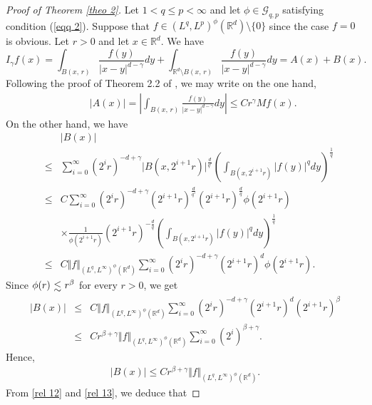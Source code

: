 \documentclass[10pt,a4paper]{amsart}
\numberwithin{equation}{section}
\numberwithin{equation}{section}
\def\lsim{\raisebox{-1ex}{$~\stackrel{\textstyle <}{\sim}~$}}
\begin{document}
\begin{proof}[Proof of Theorem \ref{theo 2}]
Let $1 < q\leq p < \infty$ and let $\phi\in \mathcal{G}_{q,p}$ satisfying condition (\ref{eqq 2}). Suppose that $f \in (L^{q},L^{p})^{\phi}(\mathbb{R}^{d})\setminus \{ 0 \}$ since the case $f=0$ is obvious. Let $r>0$ and let $x \in \mathbb{R}^{d}$. We have
$$ I_{\gamma} f(x)=\displaystyle\int_{B(x,\, r)}\frac{f(y)}{\left|x-y\right|^{d-\gamma}}dy+\displaystyle\int_{\mathbb{R}^{d}\setminus B(x,\, r)}\frac{f(y)}{\left|x-y\right|^{d-\gamma}}dy = A(x) + B(x) .  $$
Following the proof of Theorem 2.2 of \cite{GE}, we may write on the one hand,
\begin{eqnarray} \label{rel 12}
& & \vert A(x) \vert= \left\vert \displaystyle\int_{B(x,\, r)}\frac{f(y)}{\left|x-y\right|^{d-\gamma}}dy \right\vert \leq C r^{\gamma} M f(x).
\end{eqnarray}
On the other hand, we have
\begin{eqnarray*}
& &\vert B(x) \vert  \\
& \leq & \sum\limits^{\infty}_{i=0} (2^{i}r)^{-d+\gamma} \vert B(x,2^{i+1}r) \vert^{\frac{d}{q'}} \left( \displaystyle\int_{B(x,2^{i+1}r)} \vert f(y)\vert^{q} dy\right)^{\frac{1}{q}}\\
 &\leq & C \sum\limits^{\infty}_{i=0} (2^{i}r)^{-d+\gamma} (2^{i+1}r)^{\frac{d}{q'}}(2^{i+1}r)^{\frac{d}{q}} \phi(2^{i+1}r) \\ & & \times \frac{1}{\phi(2^{i+1}r)}(2^{i+1}r)^{-\frac{d}{q}}\left( \displaystyle\int_{B(x,2^{i+1}r)} \vert f(y)\vert^{q} dy\right)^{\frac{1}{q}}\\
 &\leq & C \Vert f \Vert_{(L^{q},L^{\infty})^{\phi}(\mathbb{R}^{d})}\sum\limits^{\infty}_{i=0} (2^{i}r)^{-d+\gamma} (2^{i+1}r)^{d} \phi(2^{i+1}r).
\end{eqnarray*}
Since $\phi(r) \lsim  r^{\beta}$ for every $r > 0$, we get
\begin{eqnarray*} 
\vert B(x) \vert &\leq & C \Vert f \Vert_{(L^{q},L^{\infty})^{\phi}(\mathbb{R}^{d})}\sum\limits^{\infty}_{i=0} (2^{i}r)^{-d+\gamma} (2^{i+1}r)^{d} (2^{i+1}r)^{\beta}\\&\leq & C r^{\beta +\gamma}\Vert f \Vert_{(L^{q},L^{\infty})^{\phi}(\mathbb{R}^{d})}\sum\limits^{\infty}_{i=0} (2^{i})^{\beta +\gamma}.
\end{eqnarray*}
Hence,
\begin{eqnarray}\label{rel 13}
\vert B(x) \vert \leq C r^{\beta +\gamma}\Vert f \Vert_{(L^{q},L^{\infty})^{\phi}(\mathbb{R}^{d})}.
\end{eqnarray}
From \eqref{rel 12} and \eqref{rel 13}, we deduce that

\end{proof}
\end{document}
